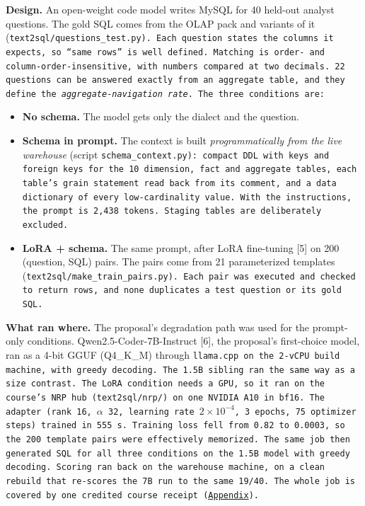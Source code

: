 \textbf{Design.} An open-weight code model writes MySQL for 40 held-out analyst questions. The gold SQL comes from
the OLAP pack and variants of it (\tt{text2sql/questions\_test.py}). Each question states the columns it expects,
so ``same rows'' is well defined. Matching is order- and column-order-insensitive, with numbers compared at two
decimals. 22 questions can be answered exactly from an aggregate table, and they define the
\emph{aggregate-navigation rate}. The three conditions are:
\begin{itemize}
\item \textbf{No schema.} The model gets only the dialect and the question.
\item \textbf{Schema in prompt.} The context is built \emph{programmatically from the live warehouse}
(script \tt{schema\_context.py}): compact DDL with keys and foreign keys for the 10 dimension, fact and
aggregate tables, each table's grain statement read back from its comment, and a data dictionary of every
low-cardinality value. With the instructions, the prompt is 2,438 tokens. Staging tables are deliberately excluded.
\item \textbf{LoRA + schema.} The same prompt, after LoRA fine-tuning [5] on 200 (question, SQL) pairs. The pairs
come from 21 parameterized templates (\tt{text2sql/make\_train\_pairs.py}). Each pair was executed and checked to
return rows, and none duplicates a test question or its gold SQL.
\end{itemize}

\textbf{What ran where.} The proposal's degradation path was used for the prompt-only conditions.
Qwen2.5-Coder-7B-Instruct [6], the proposal's first-choice model, ran as a 4-bit GGUF (Q4\_K\_M) through
\tt{llama.cpp} on the 2-vCPU build machine, with greedy decoding. The 1.5B sibling ran the same way as a size
contrast. The LoRA condition needs a GPU, so it ran on the course's NRP hub (\tt{text2sql/nrp/}) on one
NVIDIA A10 in bf16. The adapter (rank 16, $\alpha$ 32, learning rate $2\times10^{-4}$, 3 epochs, 75 optimizer
steps) trained in 555~s. Training loss fell from 0.82 to 0.0003, so the 200 template pairs were effectively
memorized. The same job then generated SQL for all three conditions on the 1.5B model with greedy decoding.
Scoring ran back on the warehouse machine, on a clean rebuild that re-scores the 7B run to the same 19/40. The
whole job is covered by one credited course receipt (\hyperref[app:receipt]{Appendix}).



